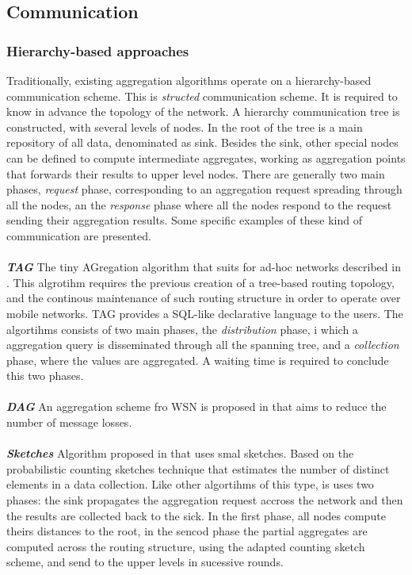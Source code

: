 \subsection{Communication}

\subsubsection{Hierarchy-based approaches} 
Traditionally, existing aggregation algorithms operate on a hierarchy-based communication scheme. This is \textit{structed} communication scheme. It is required to know in advance the topology of the network. A hierarchy communication tree is constructed, with several levels of nodes. In the root of the tree is a main repository of all data, denominated as sink. Besides the sink, other special nodes can be defined to compute intermediate aggregates, working as aggregation points that forwards their results to upper level nodes. There are generally two main phases, \textit{request} phase, corresponding to an aggregation request spreading through all the nodes, an the \textit{response} phase where all the nodes respond to the request sending their aggregation results. Some specific examples of these kind of communication are presented.\\
\\
\textbf{\textit{TAG}} The tiny AGregation algorithm that suits for ad-hoc networks described in \cite{madden2002tag}. This algrotihm requires the previous creation of a tree-based routing topology, and the continous maintenance of such routing structure in order to operate over mobile networks. TAG provides a SQL-like declarative language to the users. The algortihms consists of two main phases, the \textit{distribution} phase, i which a aggregation query is disseminated through all the spanning tree, and a \textit{collection} phase, where the values are aggregated. A waiting time is required to conclude this two phases.\\
\\ 
\textbf{\textit{DAG}} An aggregation scheme fro WSN is proposed in \cite{motegi2006dag} that aims to reduce the number of message losses. \\
\\
\textbf{\textit{Sketches}} Algorithm proposed in \cite{considine2004approximate} that uses smal sketches. Based on the probabilistic counting sketches technique that estimates the number of distinct elements in a data collection. Like other algortihms of this type, is uses two phases: the sink propagates the aggregation request accross the network and then the results are collected back to the sick. In the first phase, all nodes compute theirs distances to the root, in the sencod phase the partial aggregates are computed across the routing structure, using the adapted counting sketch scheme, and send to the upper levels in sucessive rounds.\\

